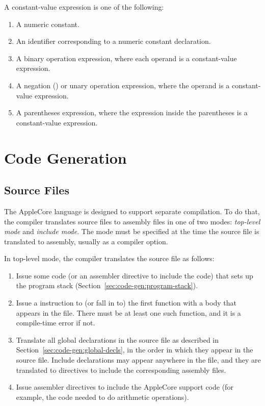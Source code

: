 \documentclass[10pt]{article}
\begin{document}
A constant-value expression is one of the following:
%
\begin{enumerate}
%
\item A numeric constant.
%
\item An identifier corresponding to a numeric constant declaration.
%
\item A binary operation expression, where each operand is a
  constant-value expression.
%
\item A negation (\kwd{-}) or  unary operation expression,
  where the operand is a constant-value expression.
%
\item A parentheses expression, where the expression inside the
  parentheses is a constant-value expression.
%
\end{enumerate}

\section{Code Generation}
\label{sec:code-gen}

\subsection{Source Files}
\label{sec:code-gen:source-files}

The AppleCore language is designed to support separate compilation.
To do that, the compiler translates source files to assembly files in
one of two modes: \emph{top-level mode} and \emph{include mode}.  The
mode must be specified at the time the source file is translated to
assembly, usually as a compiler option.

  In top-level mode, the compiler translates
the source file as follows:
%
\begin{enumerate}
%
\item Issue some code (or an assembler directive to include the code)
  that sets up the program stack
  (Section~\ref{sec:code-gen:program-stack}).
%
\item Issue a  instruction to (or fall in to) the first
  function with a body that appears in the file.  There must be at
  least one such function, and it is a compile-time error if not.
%
\item Translate all global declarations in the source file as
  described in Section~\ref{sec:code-gen:global-decls}, in the
  order in which they appear in the source file.  Include declarations
  may appear anywhere in the file, and they are translated to
  directives to include the corresponding assembly files.
%
\item Issue assembler directives to include the AppleCore support code
  (for example, the code needed to do arithmetic operations).
%
\end{enumerate}
\end{document}
